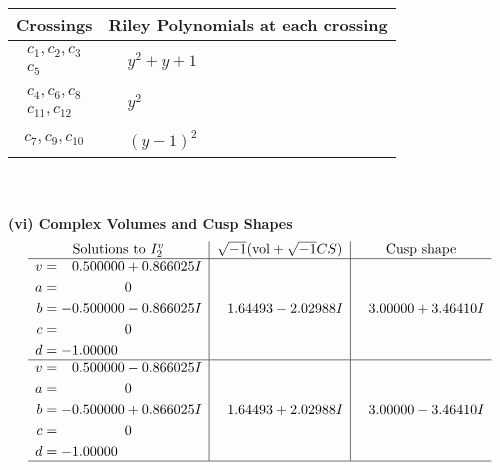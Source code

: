 \documentclass[1p]{elsarticle_modified}
\theoremstyle{definition}
\newcommand{\I}{\sqrt{-1}}
\begin{document}
\begin{tabular}{m{50pt}|m{274pt}}
Crossings & \hspace{64pt}Riley Polynomials at each crossing \\
\hline $$\begin{aligned}c_{1},c_{2},c_{3}\\c_{5}\end{aligned}$$&$\begin{aligned}
&y^2+y+1
\end{aligned}$\\
\hline $$\begin{aligned}c_{4},c_{6},c_{8}\\c_{11},c_{12}\end{aligned}$$&$\begin{aligned}
&y^2
\end{aligned}$\\
\hline $$\begin{aligned}c_{7},c_{9},c_{10}\end{aligned}$$&$\begin{aligned}
&(y-1)^2
\end{aligned}$\\
\hline
\end{tabular}\\~\\
\newpage\flushleft \textbf{(vi) Complex Volumes and Cusp Shapes}
$$\begin{array}{c|c|c}  
\text{Solutions to }I^v_{2}& \I (\text{vol} + \sqrt{-1}CS) & \text{Cusp shape}\\
 \hline 
\begin{aligned}
v &= \phantom{-}0.500000 + 0.866025 I \\
a &= \phantom{-0.000000 } 0 \\
b &= -0.500000 - 0.866025 I \\
c &= \phantom{-0.000000 } 0 \\
d &= -1.00000\phantom{ +0.000000I}\end{aligned}
 & \phantom{-}1.64493 - 2.02988 I & \phantom{-}3.00000 + 3.46410 I \\ \hline\begin{aligned}
v &= \phantom{-}0.500000 - 0.866025 I \\
a &= \phantom{-0.000000 } 0 \\
b &= -0.500000 + 0.866025 I \\
c &= \phantom{-0.000000 } 0 \\
d &= -1.00000\phantom{ +0.000000I}\end{aligned}
 & \phantom{-}1.64493 + 2.02988 I & \phantom{-}3.00000 - 3.46410 I\\
 \hline 
 \end{array}$$\newpage\newpage\renewcommand{\arraystretch}{1}
\end{document}
